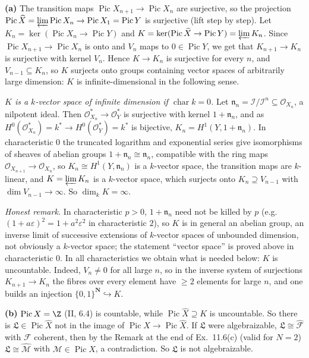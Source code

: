 \documentclass[11pt]{article}
\begin{document}
\textbf{(a)} The transition maps $\operatorname{Pic}X_{n+1}\to\operatorname{Pic}X_n$ are surjective, so the projection $\operatorname{Pic}\widehat X=\varprojlim\operatorname{Pic}X_n\to\operatorname{Pic}X_1=\operatorname{Pic}Y$ is surjective (lift step by step). Let $K_n=\ker(\operatorname{Pic}X_n\to\operatorname{Pic}Y)$ and $K=\ker(\operatorname{Pic}\widehat X\to\operatorname{Pic}Y)=\varprojlim K_n$. Since $\operatorname{Pic}X_{n+1}\to\operatorname{Pic}X_n$ is onto and $V_n$ maps to $0\in\operatorname{Pic}Y$, we get that $K_{n+1}\to K_n$ is surjective with kernel $V_n$. Hence $K\to K_n$ is surjective for every $n$, and $V_{n-1}\subseteq K_n$, so $K$ surjects onto groups containing vector spaces of arbitrarily large dimension: $K$ is infinite-dimensional in the following sense.

\emph{$K$ is a $k$-vector space of infinite dimension if $\operatorname{char}k=0$.} Let $\mathfrak n_n=\mathcal I/\mathcal I^n\subseteq\mathcal O_{X_n}$, a nilpotent ideal. Then $\mathcal O^*_{X_n}\to\mathcal O^*_Y$ is surjective with kernel $1+\mathfrak n_n$, and as $H^0(\mathcal O^*_{X_n})=k^*\to H^0(\mathcal O_Y^*)=k^*$ is bijective, $K_n=H^1(Y,1+\mathfrak n_n)$. In characteristic $0$ the truncated logarithm and exponential series give isomorphisms of sheaves of abelian groups $1+\mathfrak n_n\cong\mathfrak n_n$, compatible with the ring maps $\mathcal O_{X_{n+1}}\to\mathcal O_{X_n}$, so $K_n\cong H^1(Y,\mathfrak n_n)$ is a $k$-vector space, the transition maps are $k$-linear, and $K=\varprojlim K_n$ is a $k$-vector space, which surjects onto $K_n\supseteq V_{n-1}$ with $\dim V_{n-1}\to\infty$. So $\dim_kK=\infty$.

\emph{Honest remark.} In characteristic $p>0$, $1+\mathfrak n_n$ need not be killed by $p$ (e.g.\ $(1+a\varepsilon)^2=1+a^2\varepsilon^2$ in characteristic $2$), so $K$ is in general an abelian group, an inverse limit of successive extensions of $k$-vector spaces of unbounded dimension, not obviously a $k$-vector space; the statement ``vector space'' is proved above in characteristic $0$. In all characteristics we obtain what is needed below: $K$ is uncountable. Indeed, $V_n\ne0$ for all large $n$, so in the inverse system of surjections $K_{n+1}\to K_n$ the fibres over every element have $\ge2$ elements for large $n$, and one builds an injection $\{0,1\}^{\mathbf N}\hookrightarrow K$.

\textbf{(b)} $\operatorname{Pic}X=\Z$ (II, 6.4) is countable, while $\operatorname{Pic}\widehat X\supseteq K$ is uncountable. So there is $\mathfrak L\in\operatorname{Pic}\widehat X$ not in the image of $\operatorname{Pic}X\to\operatorname{Pic}\widehat X$. If $\mathfrak L$ were algebraizable, $\mathfrak L\cong\widehat{\mathcal F}$ with $\mathcal F$ coherent, then by the Remark at the end of Ex.~11.6(c) (valid for $N=2$) $\mathfrak L\cong\widehat{\mathcal M}$ with $\mathcal M\in\operatorname{Pic}X$, a contradiction. So $\mathfrak L$ is not algebraizable.
\end{document}
